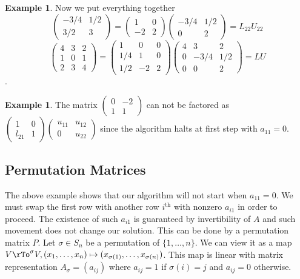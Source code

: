 \documentclass[12pt]{amsart}
\theoremstyle{definition}
\newtheorem{example}[theorem]{Example}
\begin{document}
\begin{example}
Now we put everything together
$$\left(\begin{array}{cc} -3/4 & 1/2 \\ 3/2 & 3 \end{array}\right) =  \left(\begin{array}{cc} 1 & 0 \\ -2 & 2 \end{array}\right) \left(\begin{array}{cc} -3/4 & 1/2 \\ 0 & 2 \end{array}\right) = L_{22}U_{22}$$
$$\left(\begin{array}{ccc} 4 & 3 & 2\\ 1 & 0 & 1\\ 2 & 3 & 4\end{array}\right) = \left(\begin{array}{ccc} 1 & 0 & 0 \\ 1/4 & 1 & 0 \\ 1/2 & -2 & 2 \end{array}\right)\left(\begin{array}{ccc} 4 & 3 & 2 \\ 0 & -3/4 & 1/2 \\ 0 & 0 & 2\end{array}\right) = LU$$.
\end{example}

\begin{example} The matrix $\left(\begin{array}{cc} 0 & -2\\ 1 & 1 \end{array}\right)$ can not be factored as $\left(\begin{array}{cc} 1 & 0 \\ l_{21} & 1 \end{array}\right)\left(\begin{array}{cc} u_{11} & u_{12} \\ 0 & u_{22} \end{array}\right)$ since the algorithm halts at first step with $a_{11} = 0$.
\end{example}

\subsection{Permutation Matrices} The above example shows that our algorithm will not start when $a_{11} = 0$. We must swap the first row with another row $i^{\text{th}}$ with nonzero $a_{i1}$ in order to proceed. The existence of such $a_{i1}$ is guaranteed by invertibility of $A$ and such movement does not change our solution. This can be done by a permutation matrix $P$. Let $\sigma \in S_n$ be a permutation of $\{1, \dots , n\}$. We can view it as a map $V \rTo^{\sigma} V, (x_1, \dots, x_n) \mapsto (x_{\sigma(1)}, \dots , x_{\sigma(n)})$. This map is linear with matrix representation $A_{\sigma} = (a_{ij})$ where $a_{ij} = 1$ if $\sigma(i) = j$ and $a_{ij} = 0$ otherwise.
\end{document}

